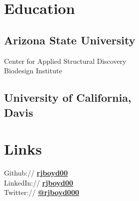 \documentclass[]{deedy-resume-openfont}
\begin{document}
%
%
\lastupdated

%
%

%
%

\begin{minipage}[t]{0.32\textwidth} 


\section{Education} 

\subsection{Arizona State University}
Center for Applied Structural Discovery \\
Biodesign Institute \\
\sectionsep


\subsection{University of California,\\ Davis}


\section{Links} 
Github:// \href{https://github.com/rjboyd00}{\bf rjboyd00} \\
LinkedIn://  \href{https://www.linkedin.com/in/rjboyd00}{\bf rjboyd00} \\
Twitter://  \href{https://twitter.com/rjboyd000}{\bf @rjboyd000} \\


\end{minipage}
\end{document}
